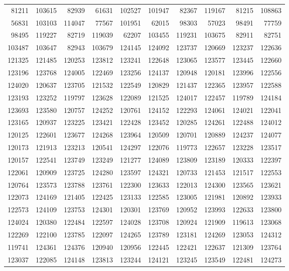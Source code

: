 {\begin{longtable}{rrrrrrrrrr}
81211 & 103615 & 82939 & 61631 & 102527 & 101947 & 82367 & 119167 & 81215 & 108863\\
56831 & 103103 & 114047 & 77567 & 101951 & 62015 & 98303 & 57023 & 98491 & 77759\\
98495 & 119227 & 82719 & 119039 & 62207 & 103455 & 119231 & 103675 & 82911 & 82751\\
103487 & 103647 & 82943 & 103679 & 124145 & 124092 & 123737 & 120669 & 123237 & 122636\\
121325 & 121485 & 120253 & 123812 & 123241 & 122648 & 123065 & 123577 & 123445 & 122660\\
123196 & 123768 & 124005 & 122469 & 123256 & 124137 & 120948 & 120181 & 123996 & 122556\\
124020 & 120637 & 123705 & 121532 & 122549 & 120829 & 121437 & 122365 & 123957 & 122588\\
123193 & 123252 & 119797 & 123628 & 122089 & 121525 & 124017 & 122457 & 119789 & 124184\\
123693 & 123580 & 120757 & 124252 & 120761 & 124152 & 122293 & 124061 & 124021 & 122041\\
123165 & 120937 & 123225 & 123421 & 122428 & 123452 & 120285 & 124261 & 122488 & 124012\\
120125 & 122601 & 123677 & 124268 & 123964 & 120509 & 120701 & 120889 & 124237 & 124077\\
120173 & 121913 & 123213 & 120541 & 124297 & 122076 & 119773 & 122657 & 123228 & 123517\\
120157 & 122541 & 123749 & 123249 & 121277 & 124089 & 123809 & 123189 & 120333 & 122397\\
122061 & 120909 & 123725 & 124280 & 123597 & 124321 & 120733 & 121453 & 121517 & 122553\\
120764 & 123573 & 123788 & 123761 & 122300 & 123633 & 122013 & 124300 & 123565 & 123621\\
122073 & 124169 & 121405 & 122425 & 123133 & 122585 & 123005 & 121981 & 120892 & 123933\\
122573 & 124109 & 123753 & 124301 & 120301 & 123769 & 120952 & 123993 & 122633 & 123800\\
124024 & 120380 & 122484 & 122597 & 124028 & 123708 & 120924 & 121909 & 119613 & 123068\\
122269 & 122100 & 123785 & 122097 & 124265 & 123789 & 123181 & 124269 & 123053 & 124312\\
119741 & 124361 & 124376 & 120940 & 120956 & 122445 & 122421 & 122637 & 121309 & 123764\\
123037 & 122085 & 124148 & 123813 & 123244 & 124121 & 123245 & 123549 & 122481 & 124273\\

\end{longtable}}
